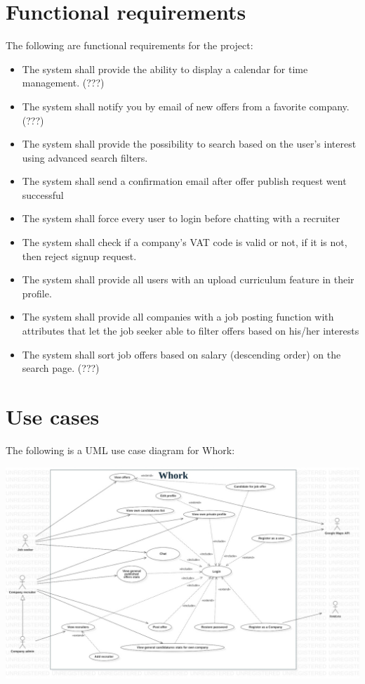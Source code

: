 \documentclass[12pt, a4paper]{article}
\begin{document}
\section{Functional requirements}
The following are functional requirements for the project:
\begin{itemize}
	\item The system shall provide the ability to display a calendar for time management. (???)
	\item The system shall notify you by email of new offers from a favorite company. (???)
	\item The system shall provide the possibility to search based on the user's interest using advanced search filters.
	\item The system shall send a confirmation email after offer publish request went successful
	\item The system shall force every user to login before chatting with a recruiter
	\item The system shall check if a company's VAT code is valid or not, if it is not, then reject signup request.
	\item The system shall provide all users with an upload curriculum feature in their profile.
	\item The system shall provide all companies with a job posting function with attributes that let the job seeker 
	able to filter offers based on his/her interests
	\item The system shall sort job offers based on salary (descending order) on the search page. (???)
\end{itemize}

\newpage
\section{Use cases}
The following is a UML use case diagram for Whork:

\begin{center}
	\includegraphics[scale=1.7]{diagrams/project/usecase/usecase_scaled.jpg}
\end{center}
\end{document}
